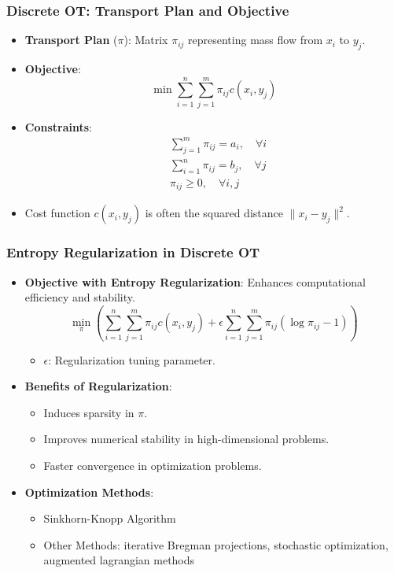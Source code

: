 \documentclass{beamer}
\begin{document}
	\begin{frame}
		\frametitle{Discrete OT: Transport Plan and Objective}
		\begin{itemize}
			\item \textbf{Transport Plan} (\(\pi\)): Matrix \(\pi_{ij}\) representing mass flow from \(x_i\) to \(y_j\).
			\item \textbf{Objective}:
			\[
			\min \sum_{i=1}^n \sum_{j=1}^m \pi_{ij} c(x_i, y_j)
			\]
			\item \textbf{Constraints}:
			\begin{align*}
				&\sum_{j=1}^m \pi_{ij} = a_i, \quad \forall i \\
				&\sum_{i=1}^n \pi_{ij} = b_j, \quad \forall j \\
				&\pi_{ij} \geq 0, \quad \forall i, j
			\end{align*}
			\item Cost function \(c(x_i, y_j)\) is often the squared distance \(\|x_i - y_j\|^2\).
		\end{itemize}
	\end{frame}
	
	\begin{frame}
		\frametitle{Entropy Regularization in Discrete OT}
		\begin{itemize}
			\item \textbf{Objective with Entropy Regularization}: Enhances computational efficiency and stability.
			\[
			\min_{\pi} \left( \sum_{i=1}^n \sum_{j=1}^m \pi_{ij} c(x_i, y_j) + \epsilon \sum_{i=1}^n \sum_{j=1}^m \pi_{ij} (\log \pi_{ij} - 1) \right)
			\]
			\begin{itemize}
				\item \(\epsilon\): Regularization tuning parameter.
			\end{itemize}
			
			\item \textbf{Benefits of Regularization}:
			\begin{itemize}
				\item Induces sparsity in \(\pi\).
				\item Improves numerical stability in high-dimensional problems.
				\item Faster convergence in optimization problems.
			\end{itemize}
			
			\item \textbf{Optimization Methods}:
			\begin{itemize}
				\item {Sinkhorn-Knopp Algorithm}
				
				\item {Other Methods}: iterative Bregman projections, stochastic optimization, augmented lagrangian methods
			\end{itemize}
		\end{itemize}
	\end{frame}
	
\end{document}
